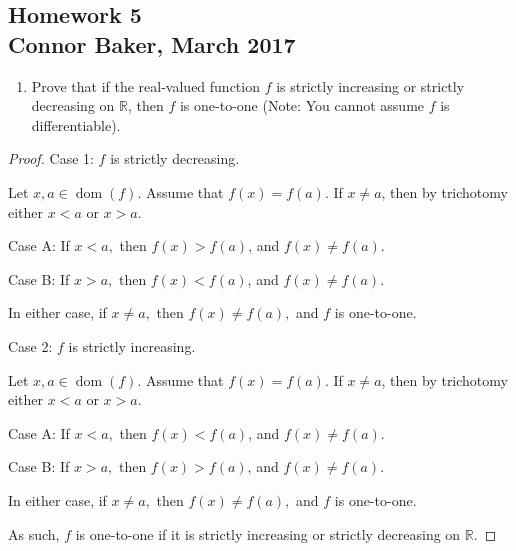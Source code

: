 \documentclass[10pt]{article}
\theoremstyle{definition}
\theoremstyle{plain}
\newcommand{\R}{\mathbb{R}}
\DeclareMathOperator\dom{dom}
\begin{document}
\begin{center}
  \subsection*{Homework 5\\Connor Baker, March 2017}
\end{center}

\begin{enumerate}
\item Prove that if the real-valued function $f$ is strictly increasing or strictly decreasing on $\R$, then $f$ is one-to-one (Note:  You cannot assume $f$ is differentiable).
\end{enumerate}



\begin{proof}
  Case 1: $f$ is strictly decreasing.

  Let $x,a\in\dom(f).$ Assume that $f(x)=f(a)$. If $x\neq a$, then by trichotomy either $x<a$ or $x>a.$

  Case A: If $x<a,$ then $f(x) > f(a)$, and $f(x)\neq f(a)$.

  Case B: If $x>a,$ then $f(x) < f(a)$, and $f(x)\neq f(a)$.

  In either case, if $x\neq a,$ then  $f(x)\neq f(a),$ and $f$ is one-to-one.

  Case 2: $f$ is strictly increasing.

  Let $x,a\in\dom(f).$ Assume that $f(x)=f(a)$. If $x\neq a$, then by trichotomy either $x<a$ or $x>a.$

  Case A: If $x<a,$ then $f(x) < f(a)$, and $f(x)\neq f(a)$.

  Case B: If $x>a,$ then $f(x) > f(a)$, and $f(x)\neq f(a)$.

  In either case, if $x\neq a,$ then  $f(x)\neq f(a),$ and $f$ is one-to-one.

  As such, $f$ is one-to-one if it is strictly increasing or strictly decreasing on $\R$.
\end{proof}



\pagebreak
\end{document}
